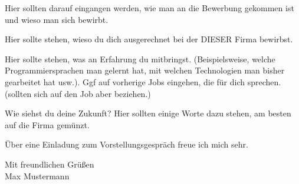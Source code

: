 \documentclass[a4paper,10pt]{article}
\newcommand{\nachname}{Mustermann }                      %
\newcommand{\vorname}{Max }
\begin{document}
Hier sollten darauf eingangen werden, wie man an die Bewerbung gekommen ist und wieso man sich bewirbt. 

Hier sollte stehen, wieso du dich ausgerechnet bei der DIESER Firma bewirbst.

Hier sollte stehen, was an Erfahrung du mitbringst. (Beispielsweise, welche Programmiersprachen man gelernt hat, mit welchen Technologien man bisher gearbeitet hat usw.). Ggf auf vorherige Jobs eingehen, die f\"ur dich sprechen. (sollten sich auf den Job aber beziehen.)

Wie siehst du deine Zukunft? Hier sollten einige Worte dazu stehen, am besten auf die Firma gem\"unzt. 

\"Uber eine Einladung zum Vorstellungsgespr\"ach freue ich mich sehr.

\hbox{}\hbox{}
Mit freundlichen Gr\"u{\ss}en\\

\vorname \nachname
\end{document}

